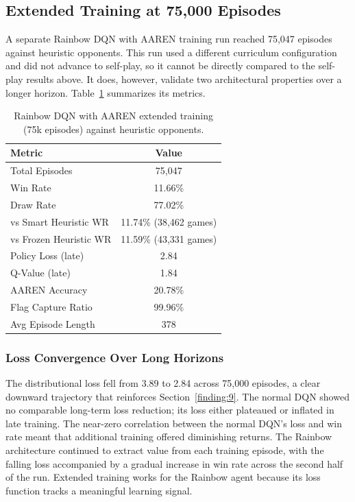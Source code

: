 \subsection{Extended Training at 75,000 Episodes}

A separate Rainbow DQN with AAREN training run reached 75,047 episodes against heuristic opponents. This run used a different curriculum configuration and did not advance to self-play, so it cannot be directly compared to the self-play results above. It does, however, validate two architectural properties over a longer horizon. Table~\ref{tab:rdqn75k} summarizes its metrics.

\begin{table}[htbp]
\centering
\caption{Rainbow DQN with AAREN extended training (75k episodes) against heuristic opponents.}
\label{tab:rdqn75k}
\begin{tabular}{l c}
\hline
\textbf{Metric} & \textbf{Value} \\ \hline
Total Episodes          & 75,047 \\
Win Rate                & 11.66\% \\
Draw Rate               & 77.02\% \\
vs Smart Heuristic WR   & 11.74\% (38,462 games) \\
vs Frozen Heuristic WR  & 11.59\% (43,331 games) \\
Policy Loss (late)      & 2.84 \\
Q-Value (late)          & 1.84 \\
AAREN Accuracy          & 20.78\% \\
Flag Capture Ratio      & 99.96\% \\
Avg Episode Length      & 378 \\
\hline
\end{tabular}
\end{table}

\subsubsection{Loss Convergence Over Long Horizons}\label{finding:13}
The distributional loss fell from 3.89 to 2.84 across 75,000 episodes, a clear downward trajectory that reinforces Section~\ref{finding:9}. The normal DQN showed no comparable long-term loss reduction; its loss either plateaued or inflated in late training. The near-zero correlation between the normal DQN's loss and win rate meant that additional training offered diminishing returns. The Rainbow architecture continued to extract value from each training episode, with the falling loss accompanied by a gradual increase in win rate across the second half of the run. Extended training works for the Rainbow agent because its loss function tracks a meaningful learning signal.

